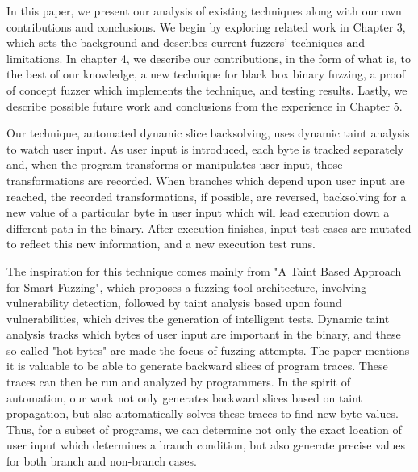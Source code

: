 \documentclass[11pt,expanded,copyright]{fsuthesis}
\begin{document}
In this paper, we present our analysis of existing techniques along with our own contributions and conclusions. We begin by exploring related work in Chapter 3, which sets the background and describes current fuzzers' techniques and limitations. In chapter 4, we describe our contributions, in the form of what is, to the best of our knowledge, a new technique for black box binary fuzzing, a proof of concept fuzzer which implements the technique, and testing results. Lastly, we describe possible future work and conclusions from the experience in Chapter 5.

Our technique, automated dynamic slice backsolving, uses dynamic taint analysis to watch user input. As user input is introduced, each byte is tracked separately and, when the program transforms or manipulates user input, those transformations are recorded. When branches which depend upon user input are reached, the recorded transformations, if possible, are reversed, backsolving for a new value of a particular byte in user input which will lead execution down a different path in the binary. After execution finishes, input test cases are mutated to reflect this new information, and a new execution test runs.

The inspiration for this technique comes mainly from "A Taint Based Approach for Smart Fuzzing", which proposes a fuzzing tool architecture, involving vulnerability detection, followed by taint analysis based upon found vulnerabilities, which drives the generation of intelligent tests. Dynamic taint analysis tracks which bytes of user input are important in the binary, and these so-called "hot bytes" are made the focus of fuzzing attempts. The paper mentions it is valuable to be able to generate backward slices of program traces. These traces can then be run and analyzed by programmers. In the spirit of automation, our work not only generates backward slices based on taint propagation, but also automatically solves these traces to find new byte values. Thus, for a subset of programs, we can determine not only the exact location of user input which determines a branch condition, but also generate precise values for both branch and non-branch cases.
\end{document}
